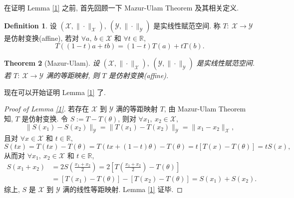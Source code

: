 \documentclass[a4paper,11pt]{article}
\newtheorem{theorem}{Theorem}[section]
\theoremstyle{definition}
\newtheorem{definition}[theorem]{Definition}
\begin{document}
在证明 Lemma \ref{1} 之前, 首先回顾一下 Mazur-Ulam Theorem 及其相关定义.

\begin{definition}
    设 $ (\mathscr{X}, \| \cdot \|_\mathscr{X}),\ (\mathscr{Y}, \| \cdot \|_\mathscr{Y}) $ 是实线性赋范空间.
    称 $ T :\ \mathscr{X} \to \mathscr{Y} $ 是仿射变换(affine), 若对 $ \forall a,\ b \in \mathcal{X} $
    和 $ \forall t \in \mathbb{R} $,
    $$
        T((1 - t) a + t b) = (1 - t) T(a) + t T(b).
    $$
\end{definition}

\begin{theorem}[Mazur-Ulam]
    设 $ (\mathscr{X}, \| \cdot \|_\mathscr{X}),\ (\mathscr{Y}, \| \cdot \|_\mathscr{Y}) $ 是实线性赋范空间.
    若 $ T :\ \mathscr{X} \to \mathscr{Y} $ 满的等距映射, 则 $ T $ 是仿射变换(affine).
\end{theorem}

现在可以开始证明 Lemma \ref{1} 了.

\begin{proof}[Proof of Lemma \ref{1}]
    若存在 $ \mathscr{X} $ 到 $ \mathscr{Y} $ 满的等距映射 $ T $, 由 Mazur-Ulam Theorem 知,
    $ T $ 是仿射变换. 令 $ S := T - T(\theta) $, 则对 $ \forall x_1,\ x_2 \in \mathcal{X} $,
    $$
        \| S(x_1) - S(x_2) \|_\mathscr{Y} 
            = \| T(x_1) - T(x_2) \|_\mathscr{Y} 
            = \| x_1 - x_2 \|_\mathscr{X},
    $$
    且对 $ \forall x \in \mathcal{X} $ 和 $ t \in \mathbb{R} $,
    $$
        S(t x) = T(t x) - T(\theta)
                 = T(t x + (1 - t) \theta) - T(\theta)
                 = t[T(x) - T(\theta)]
                 = t S(x),
    $$
    从而对 $ \forall x_1,\ x_2 \in \mathcal{X} $ 和 $ t \in \mathbb{R} $,
    \begin{align*}
        S(x_1 + x_2) &= 2 S \left( \frac{x_1 + x_2}{2} \right) 
                     = 2 \left[ T \left( \frac{x_1 + x_2}{2} \right) - T(\theta) \right] \\
                     &= [T(x_1) - T(\theta)] - [T(x_2) - T(\theta)]
                     = S(x_1) + S(x_2).
    \end{align*}
    综上, $ S $ 是 $ \mathscr{X} $ 到 $ \mathscr{Y} $ 满的线性等距映射. Lemma \ref{1} 证毕.
\end{proof}
\end{document}
